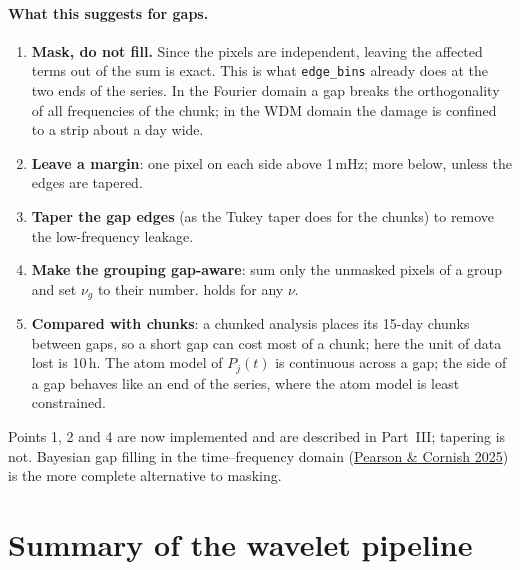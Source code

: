\documentclass[11pt,a4paper]{article}
\begin{document}
\paragraph{What this suggests for gaps.}
\begin{enumerate}
  \item \textbf{Mask, do not fill.} Since the pixels are independent, leaving the
        affected terms out of the sum is exact. This is what \texttt{edge\_bins}
        already does at the two ends of the series. In the Fourier domain a gap breaks
        the orthogonality of all frequencies of the chunk; in the WDM domain the damage
        is confined to a strip about a day wide.
  \item \textbf{Leave a margin}: one pixel on each side above 1\,mHz; more below, unless
        the edges are tapered.
  \item \textbf{Taper the gap edges} (as the Tukey taper does for the chunks) to remove
        the low-frequency leakage.
  \item \textbf{Make the grouping gap-aware}: sum only the unmasked pixels of a group and
        set $\nu_g$ to their number.  holds for any $\nu$.
  \item \textbf{Compared with chunks}: a chunked analysis places its 15-day chunks
        between gaps, so a short gap can cost most of a chunk; here the unit of data
        lost is 10\,h. The atom model of $P_j(t)$ is continuous across a gap; the side of
        a gap behaves like an end of the series, where the atom model is least
        constrained.
\end{enumerate}
Points 1, 2 and 4 are now implemented and are described in Part~III; tapering is
not. Bayesian gap filling in the time--frequency domain
(\href{https://arxiv.org/abs/2509.05479}{Pearson \& Cornish 2025}) is the more complete
alternative to masking.

\section{Summary of the wavelet pipeline}
\end{document}
